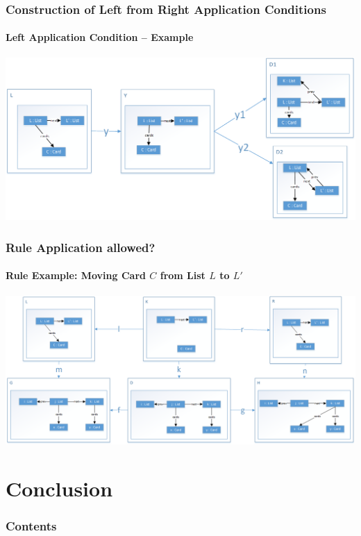 \documentclass[32pt,t]{beamer}
\begin{document}
	\begin{frame}
		\frametitle{Construction of Left from Right Application Conditions}
		\framesubtitle{Left Application Condition -- Example}
		\centering
		\includegraphics[width=\linewidth]{Images/60_Result-LeftAC}
	\end{frame}

	\begin{frame}
		\frametitle{Rule Application allowed?}
		\framesubtitle{Rule Example: Moving Card $C$ from List $L$ to $L'$}
		\centering
		\includegraphics[width=\linewidth]{Images/01_Rule_Example}
	\end{frame}

\section{Conclusion}
	\begin{frame}
		\frametitle{Contents}
		\tableofcontents[currentsection]
	\end{frame}
	
\end{document}
